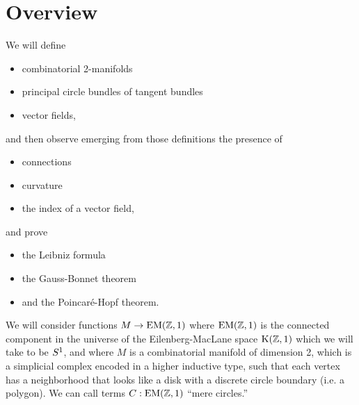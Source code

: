 \section{Overview}
We will define 
\begin{itemize}
\item combinatorial 2-manifolds
\item principal circle bundles of tangent bundles
\item vector fields,
\end{itemize}
and then observe emerging from those definitions the presence of
\begin{itemize}
\item connections
\item curvature
\item the index of a vector field,
\end{itemize}
and prove
\begin{itemize}
\item the Leibniz formula
\item the Gauss-Bonnet theorem
\item and the Poincaré-Hopf theorem.
\end{itemize}

We will consider functions \( M\to \mathrm{EM}(\mathbb{Z},1) \) where \( \mathrm{EM}(\mathbb{Z},1) \) is the connected component in the universe of the Eilenberg-MacLane space \( \mathrm{K}(\mathbb{Z},1) \) which we will take to be \( S^1 \), and where \( M \) is a combinatorial manifold of dimension 2, which is a simplicial complex encoded in a higher inductive type, such that each vertex has a neighborhood that looks like a disk with a discrete circle boundary (i.e. a polygon). We can call terms \( C:\mathrm{EM}(\mathbb{Z},1) \) ``mere circles.''


